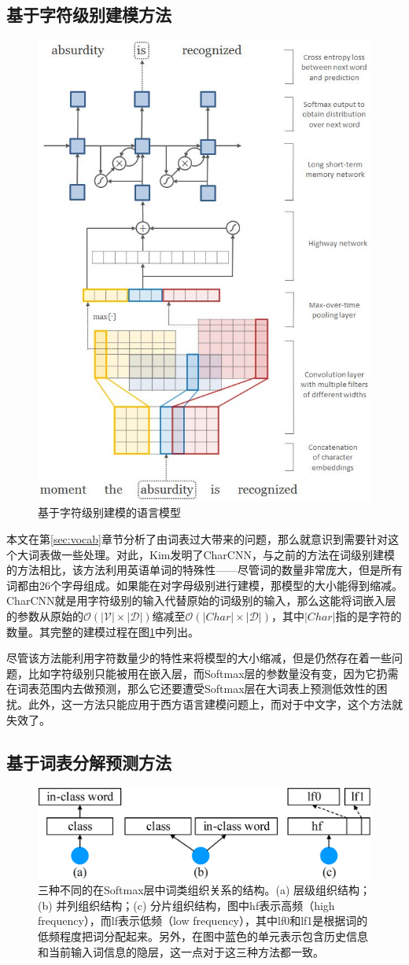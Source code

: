 \documentclass[12pt,a4paper]{article}
\begin{document}
\subsection{基于字符级别建模方法}
\begin{figure}
  \centering
  \includegraphics[width=0.4\linewidth]{./figures/CharCNN.jpg}
  \caption{基于字符级别建模的语言模型}\label{fig:charcnn}
\end{figure}
本文在第\ref{sec:vocab}章节分析了由词表过大带来的问题，那么就意识到需要针对这个大词表做一些处理。对此，Kim发明了CharCNN\cite{DBLP:conf/aaai/KimJSR16}，与之前的方法在词级别建模的方法相比，该方法利用英语单词的特殊性——尽管词的数量非常庞大，但是所有词都由26个字母组成。如果能在对字母级别进行建模，那模型的大小能得到缩减。CharCNN就是用字符级别的输入代替原始的词级别的输入，那么这能将词嵌入层的参数从原始的${\mathcal{O}(|\mathcal{V}| \times |\mathcal{D}|)}$缩减至${\mathcal{O}(|Char| \times |\mathcal{D}|)}$，其中${|Char|}$指的是字符的数量。其完整的建模过程在图\ref{fig:charcnn}中列出。

尽管该方法能利用字符数量少的特性来将模型的大小缩减，但是仍然存在着一些问题，比如字符级别只能被用在嵌入层，而Softmax层的参数量没有变，因为它扔需在词表范围内去做预测，那么它还要遭受Softmax层在大词表上预测低效性的困扰。此外，这一方法只能应用于西方语言建模问题上，而对于中文字，这个方法就失效了。

\subsection{基于词表分解预测方法}
\label{sec:vocab_facto}
\begin{figure}
  \centering
  \includegraphics[width=0.65\columnwidth]{./figures/softmax3.png}
  \caption{三种不同的在Softmax层中词类组织关系的结构。(a) 层级组织结构；(b) 并列组织结构；(c) 分片组织结构，图中hf表示高频（high frequency），而lf表示低频（low frequency），其中lf0和lf1是根据词的低频程度把词分配起来。另外，在图中蓝色的单元表示包含历史信息和当前输入词信息的隐层，这一点对于这三种方法都一致。}
  \label{fig:softmax}
\end{figure}
\end{document}
